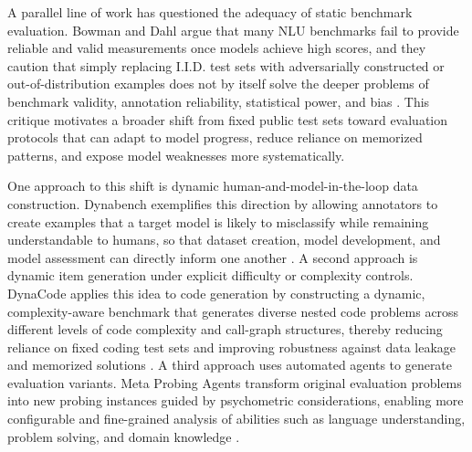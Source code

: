 \documentclass[pdflatex,sn-mathphys-num]{sn-jnl}%
\theoremstyle{thmstyleone}%
\theoremstyle{thmstyletwo}%
\theoremstyle{thmstylethree}%
\begin{document}
A parallel line of work has questioned the adequacy of static benchmark evaluation. Bowman and Dahl argue that many NLU benchmarks fail to provide reliable and valid measurements once models achieve high scores, and they caution that simply replacing I.I.D. test sets with adversarially constructed or out-of-distribution examples does not by itself solve the deeper problems of benchmark validity, annotation reliability, statistical power, and bias \cite{bowman2021take}. This critique motivates a broader shift from fixed public test sets toward evaluation protocols that can adapt to model progress, reduce reliance on memorized patterns, and expose model weaknesses more systematically.

One approach to this shift is dynamic human-and-model-in-the-loop data construction. Dynabench exemplifies this direction by allowing annotators to create examples that a target model is likely to misclassify while remaining understandable to humans, so that dataset creation, model development, and model assessment can directly inform one another \cite{kiela2021dynabench}. A second approach is dynamic item generation under explicit difficulty or complexity controls. DynaCode applies this idea to code generation by constructing a dynamic, complexity-aware benchmark that generates diverse nested code problems across different levels of code complexity and call-graph structures, thereby reducing reliance on fixed coding test sets and improving robustness against data leakage and memorized solutions \cite{hu2025dynacode}. A third approach uses automated agents to generate evaluation variants. Meta Probing Agents transform original evaluation problems into new probing instances guided by psychometric considerations, enabling more configurable and fine-grained analysis of abilities such as language understanding, problem solving, and domain knowledge \cite{zhu2024dynamic}.
\end{document}
